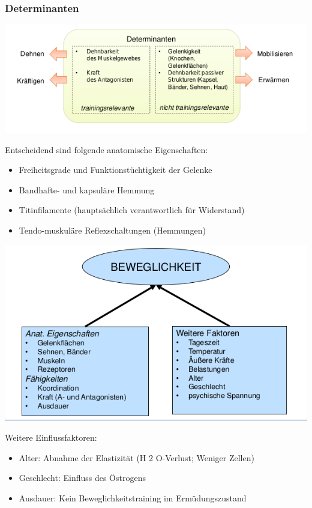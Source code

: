 \subsubsection*{Determinanten}

\includegraphics[width=\textwidth]{pictures/beweg_determinanten3}

\begin{minipage}{0.4\textwidth}
Entscheidend sind folgende anatomische Eigenschaften:
\begin{itemize}
    \item Freiheitsgrade und Funktionstüchtigkeit der Gelenke
    \item Bandhafte- und kapsuläre Hemmung
    \item Titinfilamente (hauptsächlich verantwortlich für Widerstand)
    \item Tendo-muskuläre Reflexschaltungen (Hemmungen)
\end{itemize}
\end{minipage}
\begin{minipage}{0.6\textwidth}
\includegraphics[width=\textwidth]{pictures/beweg_determinanten}
\end{minipage}
Weitere Einflussfaktoren:
\begin{itemize}
    \item Alter: Abnahme der Elastizität (H 2 O-Verlust; Weniger Zellen)
    \item Geschlecht: Einfluss des Östrogens
    \item Ausdauer: Kein Beweglichkeitstraining im Ermüdungszustand
\end{itemize}

